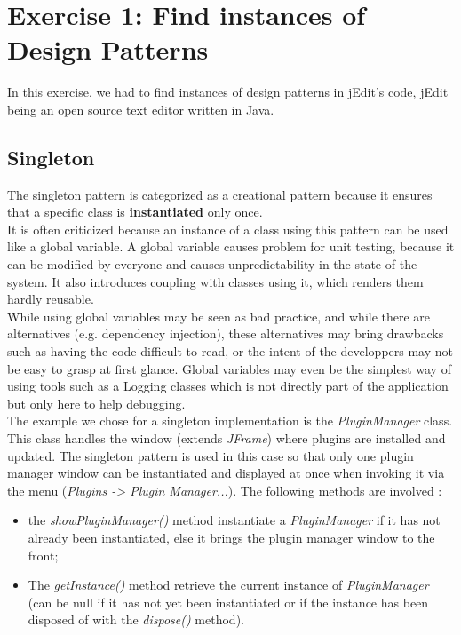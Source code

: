 \section{Exercise 1: Find instances of Design Patterns}

In this exercise, we had to find instances of design patterns in jEdit's
code, jEdit being an open source text editor written in Java.

\subsection{Singleton}
The singleton pattern is categorized as a creational pattern because it
ensures that a specific class is \textbf{instantiated} only once.\\

It is often criticized because an instance of a class using this pattern
can be used like a global variable. A global variable causes problem for
unit testing, because it can be modified by everyone and causes
unpredictability in the state of the system. It also introduces coupling
with classes using it, which renders them hardly reusable.\\ %

While using global variables may be seen as bad practice, and while
there are alternatives (e.g. dependency injection), these alternatives
may bring drawbacks such as having the code difficult to read, or the
intent of the developpers may not be easy to grasp at first glance.
Global variables may even be the simplest way of using tools such as a
Logging classes which is not directly part of the application but only
here to help debugging. \cite{cite:plSingletonGlobal} \cite{cite:soSingleton}
\cite{cite:seGlobal}\\

The example we chose for a singleton implementation is the
\emph{PluginManager}\footnotemark[1]{} class.
This class handles the window (extends \emph{JFrame}) where plugins are
installed and updated. The singleton pattern is used in this
case so that only one plugin manager window can be instantiated and
displayed at once when invoking it via the menu (\emph{Plugins -> Plugin
Manager...}). The following methods are involved :


\begin{itemize}\itemsep1pt
    \item the \emph{showPluginManager()} method instantiate a \emph{PluginManager}
    if it has not already been instantiated, else it brings the plugin manager
    window to the front;

    \item The \emph{getInstance()} method retrieve the current instance of
    \emph{PluginManager} (can be null if it has not yet been instantiated or if
    the instance has been disposed of with the \emph{dispose()} method).
\end{itemize}

